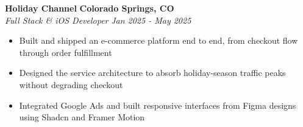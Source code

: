 \documentclass[10pt,letterpaper]{article}
\begin{document}
%

\vspace{0.2em}
\noindent\textbf{Holiday Channel} \hfill \textbf{Colorado Springs, CO}\\
\textit{Full Stack \& iOS Developer} \hfill \textit{Jan 2025 - May 2025}
\begin{itemize}
  \item Built and shipped an e-commerce platform end to end, from checkout flow through order fulfillment
  \item Designed the service architecture to absorb holiday-season traffic peaks without degrading checkout
  \item Integrated Google Ads and built responsive interfaces from Figma designs using Shadcn and Framer Motion
\end{itemize}
\end{document}
